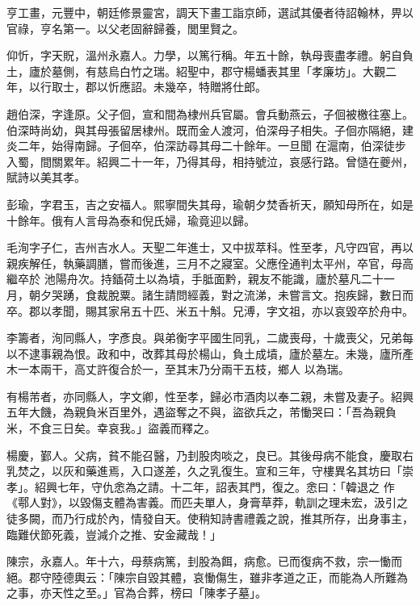 \begin{pinyinscope}
 亨工畫，元豐中，朝廷修景靈宮，調天下畫工詣京師，選試其優者待詔翰林，畀以官祿，亨名第一。以父老固辭歸養，閭里賢之。



 仰忻，字天貺，溫州永嘉人。力學，以篤行稱。年五十餘，執母喪盡孝禮。躬自負土，廬於墓側，有慈烏白竹之瑞。紹聖中，郡守楊蟠表其里「孝廉坊」。大觀二年，以行取士，郡以忻應詔。未幾卒，特贈將仕郎。



 趙伯深，字逢原。父子佪，宣和間為棣州兵官屬。會兵動燕云，子佪被檄往塞上。伯深時尚幼，與其母張留居棣州。既而金人渡河，伯深母子相失。子佪亦隔絕，建炎二年，始得南歸。子佪卒，伯深訪尋其母二十餘年。一旦聞
 在滬南，伯深徒步入蜀，間關累年。紹興二十一年，乃得其母，相持號泣，哀感行路。曾慥在夔州，賦詩以美其孝。



 彭瑜，字君玉，吉之安福人。熙寧間失其母，瑜朝夕焚香祈天，願知母所在，如是十餘年。俄有人言母為泰和倪氏婦，瑜竟迎以歸。



 毛洵字子仁，吉州吉水人。天聖二年進士，又中拔萃科。性至孝，凡守四官，再以親疾解任，執藥調膳，嘗而後進，三月不之寢室。父應佺通判太平州，卒官，母高繼卒於
 池陽舟次。持鍤荷土以為墳，手胝面黔，親友不能識，廬於墓凡二十一月，朝夕哭踴，食裁脫粟。諸生請問經義，對之流涕，未嘗言文。抱疾歸，數日而卒。郡以孝聞，賜其家帛五十匹、米五十斛。兄溥，字文祖，亦以哀毀卒於舟中。



 李籌者，洵同縣人，字彥良。與弟衡字平國生同乳，二歲喪母，十歲喪父，兄弟每以不逮事親為恨。政和中，改葬其母於楊山，負土成墳，廬於墓左。未幾，廬所產木一本兩干，高丈許復合於一，至其末乃分兩干五枝，鄉人
 以為瑞。



 有楊芾者，亦同縣人，字文卿，性至孝，歸必市酒肉以奉二親，未嘗及妻子。紹興五年大饑，為親負米百里外，遇盜奪之不與，盜欲兵之，芾慟哭曰：「吾為親負米，不食三日矣。幸哀我。」盜義而釋之。



 楊慶，鄞人。父病，貧不能召醫，乃刲股肉啖之，良已。其後母病不能食，慶取右乳焚之，以灰和藥進焉，入口遂差，久之乳復生。宣和三年，守樓異名其坊曰「崇孝」。紹興七年，守仇悆為之請。十二年，詔表其門，復之。悆曰：「韓退之
 作《鄠人對》，以毀傷支體為害義。而匹夫單人，身膏草莽，軌訓之理未宏，汲引之徒多闕，而乃行成於內，情發自天。使稍知詩書禮義之說，推其所存，出身事主，臨難伏節死義，豈減介之推、安金藏哉！」



 陳宗，永嘉人。年十六，母蔡病篤，刲股為餌，病愈。已而復病不救，宗一慟而絕。郡守陸德輿云：「陳宗自毀其體，哀慟傷生，雖非孝道之正，而能為人所難為之事，亦天性之至。」官為合葬，榜曰「陳孝子墓」。




\end{pinyinscope}

